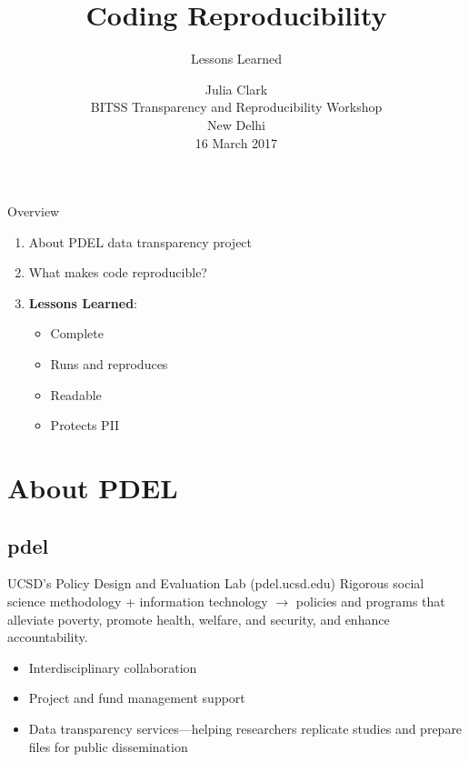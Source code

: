 \documentclass[12pt, compress]{beamer} %
\title[Short Title]{Coding Reproducibility}
\subtitle{Lessons Learned \vspace{-20pt} }
\institute{\vspace{10pt} \texttt{[image: images/pdel.png]}\vspace{10pt} \texttt{[image: images/UCSDlogo]}}
\date[Short Occasion]{Julia Clark \\ BITSS Transparency and Reproducibility Workshop \\ New Delhi \\ 16 March 2017}
\let\olditem\item %
\renewcommand{\item}{%
\olditem\vspace{\fill}}
\begin{document}

{ %
\frame{
  \titlepage
  \note{}
  }
}




	{ %
	\begin{frame}{Overview}
		\begin{enumerate}
			\item About PDEL data transparency project
			\item What makes code reproducible?
			\item \textbf{Lessons Learned}:
				\begin{itemize}
					\item Complete 
					\item Runs and reproduces
					\item Readable 
					\item Protects PII
				\end{itemize}
		\end{enumerate}
	\end{frame}
	}


\section{About PDEL}
\subsection{pdel}
	\begin{frame}{UCSD's Policy Design and Evaluation Lab (pdel.ucsd.edu)}
		 Rigorous social science methodology \textcolor{ceruleanblue}{+} information technology \textcolor{ceruleanblue}{$\rightarrow$} policies and programs that alleviate poverty, promote health, welfare, and security, and enhance accountability.
		 \pause
		 \begin{itemize}
		 	\item Interdisciplinary collaboration
		 	\item Project and fund management support 
		 	\item \textcolor{burntorange}{Data transparency services---helping researchers replicate studies and prepare files for public dissemination}
		 \end{itemize}
\end{frame}

\end{document}
